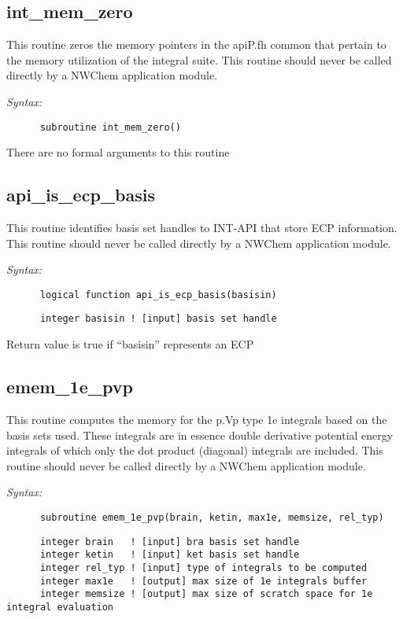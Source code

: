 \subsection{int\_mem\_zero} 
This routine zeros the memory pointers in the apiP.fh common 
that pertain to the memory utilization of the integral suite. 
This routine should never be called directly by a  
NWChem application module. 
 
{\it Syntax:} 
\begin{verbatim} 
      subroutine int_mem_zero() 
\end{verbatim} 
There are no formal arguments to this routine 
 
\subsection{api\_is\_ecp\_basis} 
This routine identifies basis set handles to INT-API  
that store ECP information. 
This routine should never be called directly by a  
NWChem application module. 
 
{\it Syntax:} 
\begin{verbatim} 
      logical function api_is_ecp_basis(basisin) 
\end{verbatim} 
\begin{verbatim} 
      integer basisin ! [input] basis set handle 
\end{verbatim} 
Return value is true if ``basisin'' represents an ECP 
 
\subsection{emem\_1e\_pvp} 
This routine computes the memory for the p.Vp type 1e 
integrals based on the basis sets used. These integrals are 
in essence double derivative potential energy integrals of which 
only the dot product (diagonal) integrals are included. 
This routine should never be called directly by a 
NWChem application module. 
 
{\it Syntax:} 
\begin{verbatim} 
      subroutine emem_1e_pvp(brain, ketin, max1e, memsize, rel_typ) 
\end{verbatim} 
\begin{verbatim} 
      integer brain   ! [input] bra basis set handle 
      integer ketin   ! [input] ket basis set handle 
      integer rel_typ ! [input] type of integrals to be computed 
      integer max1e   ! [output] max size of 1e integrals buffer 
      integer memsize ! [output] max size of scratch space for 1e integral evaluation 
\end{verbatim} 
